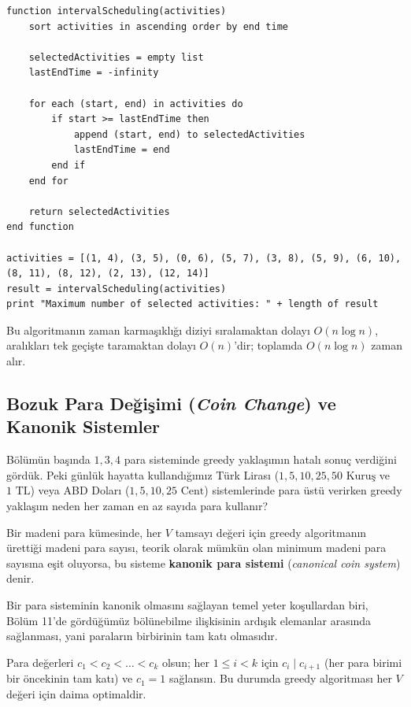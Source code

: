 \begin{lstlisting}
function intervalScheduling(activities)
    sort activities in ascending order by end time
    
    selectedActivities = empty list
    lastEndTime = -infinity
    
    for each (start, end) in activities do
        if start >= lastEndTime then
            append (start, end) to selectedActivities
            lastEndTime = end
        end if
    end for
    
    return selectedActivities
end function

activities = [(1, 4), (3, 5), (0, 6), (5, 7), (3, 8), (5, 9), (6, 10), (8, 11), (8, 12), (2, 13), (12, 14)]
result = intervalScheduling(activities)
print "Maximum number of selected activities: " + length of result\end{lstlisting}

Bu algoritmanın zaman karmaşıklığı diziyi sıralamaktan dolayı $O(n \log n)$, aralıkları tek geçişte taramaktan dolayı $O(n)$'dir; toplamda $O(n \log n)$ zaman alır.

\subsection{Bozuk Para Değişimi (\textit{Coin Change}) ve Kanonik Sistemler}

Bölümün başında $1, 3, 4$ para sisteminde greedy yaklaşımın hatalı sonuç verdiğini gördük. Peki günlük hayatta kullandığımız Türk Lirası ($1, 5, 10, 25, 50\text{ Kuruş}$ ve $1\text{ TL}$) veya ABD Doları ($1, 5, 10, 25\text{ Cent}$) sistemlerinde para üstü verirken greedy yaklaşım neden her zaman en az sayıda para kullanır?

\begin{definition}
Bir madeni para kümesinde, her $V$ tamsayı değeri için greedy algoritmanın ürettiği madeni para sayısı, teorik olarak mümkün olan minimum madeni para sayısına eşit oluyorsa, bu sisteme \textbf{kanonik para sistemi} (\textit{canonical coin system}) denir.
\end{definition}

Bir para sisteminin kanonik olmasını sağlayan temel yeter koşullardan biri, Bölüm 11'de gördüğümüz bölünebilme ilişkisinin ardışık elemanlar arasında sağlanması, yani paraların birbirinin tam katı olmasıdır.

\begin{theorem}
Para değerleri $c_1 < c_2 < \dots < c_k$ olsun; her $1 \le i < k$ için $c_i \mid c_{i+1}$ (her para birimi bir öncekinin tam katı) ve $c_1 = 1$ sağlansın. Bu durumda greedy algoritması her $V$ değeri için daima optimaldir.
\end{theorem}


